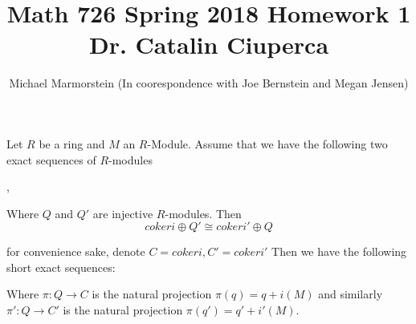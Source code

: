 \documentclass{article}
\title{Math 726 Spring 2018 Homework 1 Dr. Catalin Ciuperca}
\author{Michael Marmorstein \vspace{0.2pt} (In coorespondence with Joe Bernstein and Megan Jensen)}
\begin{document}
\maketitle

\newline
Let $R$ be a ring and $M$ an $R$-Module.  Assume that we have the following two exact sequences of $R$-modules
\newline
\begin{center}
\newline
{},
\newline
\end{center}
Where $Q$ and $Q'$ are injective $R$-modules.
Then 
$$coker i \oplus Q' \cong coker i' \oplus Q $$

\proof
for convenience sake, denote $C= coker i, C' = coker i'$ 
\newline
Then we have the following short exact sequences:
\newline
{}
\newline
{}
\newline
Where $\pi:Q \rightarrow C$ is the natural projection $\pi(q) = q + i(M)$
and similarly $\pi':Q \rightarrow C'$ is the natural projection $\pi(q') = q' + i'(M)$.
\end{document}
